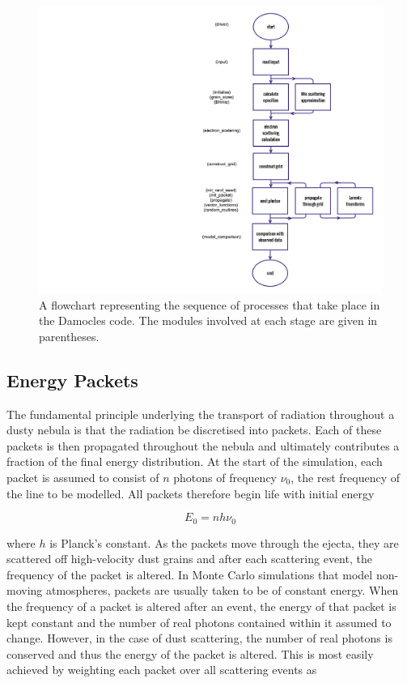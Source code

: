 	\begin{figure}
	\centering
	\includegraphics[scale=0.185, trim=650mm 25mm 8mm 25mm]{chapters/chapter2/code_flow.png}
	\caption{A flowchart representing the sequence of processes that take place in the Damocles code.  The modules involved at each stage are given in parentheses.}
	\label{fig:flowchart}
	\end{figure}

	
	
	\subsection{Energy Packets}
	
	The fundamental principle underlying the transport of radiation throughout a dusty nebula is that the radiation be discretised into packets.  Each of these packets is then propagated throughout the nebula and ultimately contributes a fraction of the final energy distribution.  At the start of the simulation, each packet is assumed to consist of $n$ photons of frequency $\nu_0$, the rest frequency of the line to be modelled.  All packets therefore begin life with initial energy

\begin{equation}
	E_0=nh\nu_0
\end{equation}
	
	
	where $h$ is Planck's constant.  As the packets move through the ejecta, they are scattered off high-velocity dust grains and after each scattering event, the frequency of the packet is altered.  In Monte Carlo simulations that model non-moving atmospheres, packets are usually taken to be of constant energy.  When the frequency of a packet is altered after an event, the energy of that packet is kept constant and the number of real photons contained within it assumed to change.  However, in the case of dust scattering, the number of real photons is conserved and thus the energy of the packet is altered.  This is most easily achieved by weighting each packet over all scattering events as 
	
